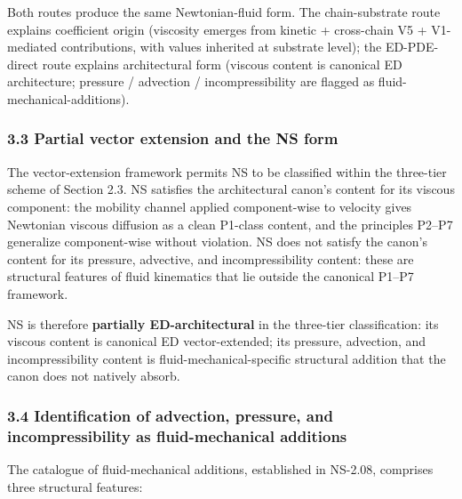 \documentclass[
]{article}
\begin{document}
Both routes produce the same Newtonian-fluid form. The chain-substrate
route explains coefficient origin (viscosity emerges from kinetic +
cross-chain V5 + V1-mediated contributions, with values inherited at
substrate level); the ED-PDE-direct route explains architectural form
(viscous content is canonical ED architecture; pressure / advection /
incompressibility are flagged as fluid-mechanical-additions).

\subsubsection{3.3 Partial vector extension and the NS
form}\label{partial-vector-extension-and-the-ns-form}

The vector-extension framework permits NS to be classified within the
three-tier scheme of Section 2.3. NS satisfies the architectural canon's
content for its viscous component: the mobility channel applied
component-wise to velocity gives Newtonian viscous diffusion as a clean
P1-class content, and the principles P2--P7 generalize component-wise
without violation. NS does not satisfy the canon's content for its
pressure, advective, and incompressibility content: these are structural
features of fluid kinematics that lie outside the canonical P1--P7
framework.

NS is therefore \textbf{partially ED-architectural} in the three-tier
classification: its viscous content is canonical ED vector-extended; its
pressure, advection, and incompressibility content is
fluid-mechanical-specific structural addition that the canon does not
natively absorb.

\subsubsection{3.4 Identification of advection, pressure, and
incompressibility as fluid-mechanical
additions}\label{identification-of-advection-pressure-and-incompressibility-as-fluid-mechanical-additions}

The catalogue of fluid-mechanical additions, established in NS-2.08,
comprises three structural features:
\end{document}

